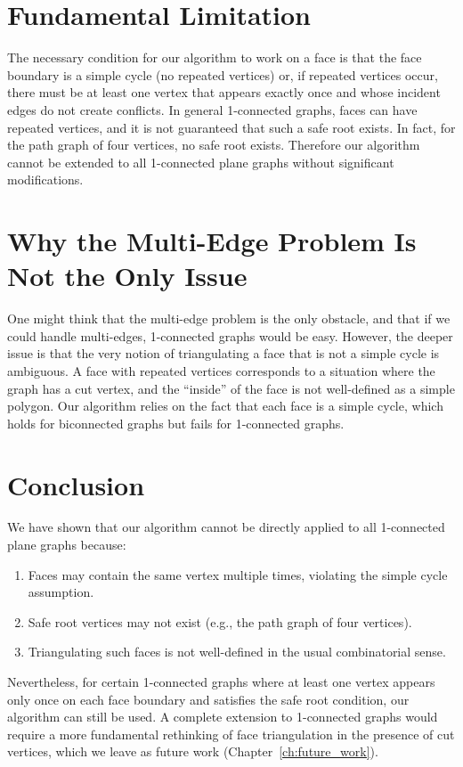 \section{Fundamental Limitation}
\label{sec:fundamental_limitation}

The necessary condition for our algorithm to work on a face is that the face boundary is a simple cycle (no repeated vertices) or, if repeated vertices occur, there must be at least one vertex that appears exactly once and whose incident edges do not create conflicts. 
In general 1-connected graphs, faces can have repeated vertices, and it is not guaranteed that such a safe root exists. 
In fact, for the path graph of four vertices, no safe root exists. 
Therefore our algorithm cannot be extended to all 1-connected plane graphs without significant modifications.

\section{Why the Multi-Edge Problem Is Not the Only Issue}
\label{sec:other_issues}

One might think that the multi-edge problem is the only obstacle, and that if we could handle multi-edges, 1-connected graphs would be easy. 
However, the deeper issue is that the very notion of triangulating a face that is not a simple cycle is ambiguous. 
A face with repeated vertices corresponds to a situation where the graph has a cut vertex, and the “inside” of the face is not well-defined as a simple polygon. 
Our algorithm relies on the fact that each face is a simple cycle, which holds for biconnected graphs but fails for 1-connected graphs.

\section{Conclusion}
\label{sec:one_connected_conclusion}

We have shown that our algorithm cannot be directly applied to all 1-connected plane graphs because:
\begin{enumerate}
    \item Faces may contain the same vertex multiple times, violating the simple cycle assumption.
    \item Safe root vertices may not exist (e.g., the path graph of four vertices).
    \item Triangulating such faces is not well-defined in the usual combinatorial sense.
\end{enumerate}
Nevertheless, for certain 1-connected graphs where at least one vertex appears only once on each face boundary and satisfies the safe root condition, our algorithm can still be used. 
A complete extension to 1-connected graphs would require a more fundamental rethinking of face triangulation in the presence of cut vertices, which we leave as future work (Chapter~\ref{ch:future_work}).